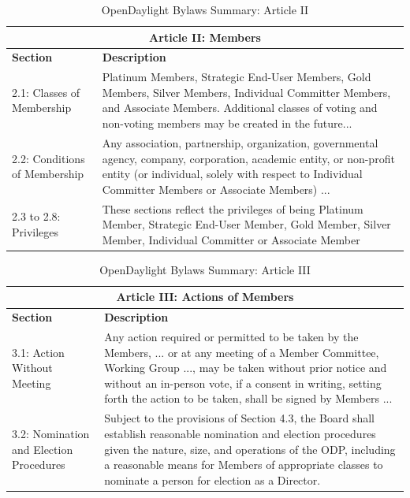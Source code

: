 \documentclass[a4paper, 12pt]{book}
\begin{document}
\begin{table}[H]
  \begin{center}
    \begin{tabular}{ | p{4cm} | p{11cm} | }
    \toprule
    \multicolumn {2}{|c|}{\textbf{Article II: Members}} \\
    \hline
    \textbf{Section} & \textbf{Description} \\
    \hline
    2.1: Classes of Membership & Platinum Members, Strategic End-User Members, Gold Members, Silver Members, Individual Committer Members, and Associate Members. Additional classes of voting and non-voting members may be created in the future...\\
    \hline
    2.2: Conditions of Membership & Any association, partnership, organization, governmental agency, company, corporation, academic entity, or non-profit entity (or individual, solely with respect to Individual Committer Members or Associate Members) ...\\
    \hline
    2.3 to 2.8: Privileges & These sections reflect the privileges of being Platinum Member, Strategic End-User Member, Gold Member, Silver Member, Individual Committer or Associate Member\\
    \bottomrule
    \end{tabular}
    \caption{OpenDaylight Bylaws Summary: Article II}
    \label{tab:odlbylaws-art02}
  \end{center}
\end{table}

\begin{table}[H]
  \begin{center}
    \begin{tabular}{ | p{4cm} | p{11cm} | }
    \toprule
    \multicolumn {2}{|c|}{\textbf{Article III: Actions of Members}} \\
    \hline
    \textbf{Section} & \textbf{Description} \\
    \hline
    3.1: Action Without Meeting & Any action required or permitted to be taken by the Members, ... or at any meeting of a Member Committee, Working Group ..., may be taken without prior notice and without an in-person vote, if a consent in writing, setting forth the action to be taken, shall be signed by Members ...\\
    \hline
    3.2: Nomination and Election Procedures & Subject to the provisions of Section 4.3, the Board shall establish reasonable nomination and election procedures given the nature, size, and operations of the ODP, including a reasonable means for Members of appropriate classes to nominate a person for election as a Director.\\
    \bottomrule
    \end{tabular}
    \caption{OpenDaylight Bylaws Summary: Article III}
    \label{tab:odlbylaws-art03}
  \end{center}
\end{table}
\end{document}
